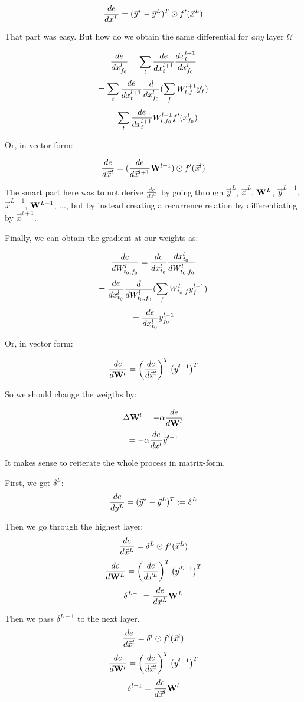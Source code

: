 $$  \frac{ \mathop{de} }{ \mathop{d\vec{x}^L} }  = (\vec{y}^* - \vec{y}^L)^T \odot f'(\vec{x}^L)  $$


That part was easy. But how do we obtain the same differential for \emph{any} layer $l$?

$$  \frac{ \mathop{de} }{ \mathop{dx_{f_0}^l} }  = \sum_t  \frac{ \mathop{de} }{ \mathop{dx_t^{l+1}} }   \frac{ \mathop{dx_t^{l+1}} }{ \mathop{dx_{f_0}^l} }   $$
$$                         = \sum_t  \frac{ \mathop{de} }{ \mathop{dx_t^{l+1}} }   \frac{ \mathop{d} }{ \mathop{dx_{f_0}^l} }  ( \sum_f W_{t,f}^{l+1} y_f^l ) $$
$$                         = \sum_t  \frac{ \mathop{de} }{ \mathop{dx_t^{l+1}} }  W_{t,f_0}^{l+1} f'(x_{f_0}^l)  $$

Or, in vector form: 

$$  \frac{ \mathop{de} }{ \mathop{d\vec{x}^l} }  = (  \frac{ \mathop{de} }{ \mathop{d\vec{x}^{l+1}} }  \mathbf{W}^{l+1} ) \odot f'(\vec{x}^l)  $$

The smart part here was to not derive $  \frac{ \mathop{de} }{ \mathop{d\vec{x}^l} }  $ by going through $\vec{y}^L$, $\vec{x}^L$, $\mathbf{W}^L$, $\vec{y}^{L-1}$, $\vec{x}^{L-1}$, $\mathbf{W}^{L-1}$, ..., but by instead creating a recurrence relation by differentiating by $\vec{x}^{l+1}$.

Finally, we can obtain the gradient at our weights as: 

$$  \frac{ \mathop{de} }{ \mathop{dW_{t_0, f_0}^l} }  =  \frac{ \mathop{de} }{ \mathop{dx_{t_0}^l} }   \frac{ \mathop{dx_{t_0}^l} }{ \mathop{dW_{t_0, f_0}^l} }    $$
$$                              =  \frac{ \mathop{de} }{ \mathop{dx_{t_0}^l} }   \frac{ \mathop{d} }{ \mathop{dW_{t_0, f_0}^l} }  ( \sum_f W_{t_0, f}^l y_f^{l-1} ) $$
$$                              =  \frac{ \mathop{de} }{ \mathop{dx_{t_0}^l} }  y_{f_0}^{l-1} $$

Or, in vector form: 

$$  \frac{ \mathop{de} }{ \mathop{d\mathbf{W}^l} }  = \left(  \frac{ \mathop{de} }{ \mathop{d\vec{x}^l} }  \right)^T  \left( \vec{y}^{l-1} \right)^T $$ 

So we should change the weigths by: 

$$ \Delta \mathbf{W}^l = - \alpha  \frac{ \mathop{de} }{ \mathop{d\mathbf{W}^l} }  $$
$$ = - \alpha  \frac{ \mathop{de} }{ \mathop{d\vec{x}^l} }  \vec{y}^{l-1} $$


It makes sense to reiterate the whole process in matrix-form. 

First, we  get $\delta^L$:
$$  \frac{ \mathop{de} }{ \mathop{d\vec{y}^L} }  = (\vec{y}^* - \vec{y}^L)^T := \delta^L $$ 

Then we go through the highest layer:
$$  \frac{ \mathop{de} }{ \mathop{d\vec{x}^L} }  = \delta^L \odot f'(\vec{x}^L)  $$
$$  \frac{ \mathop{de} }{ \mathop{d\mathbf{W}^L} }  = \left(  \frac{ \mathop{de} }{ \mathop{d\vec{x}^L} }  \right)^T \left( \vec{y}^{L-1} \right)^T $$
$$ \delta^{L-1} =  \frac{ \mathop{de} }{ \mathop{d\vec{x}^L} }  \mathbf{W}^L $$

Then we pass $\delta^{L-1}$ to the next layer. 
$$  \frac{ \mathop{de} }{ \mathop{d\vec{x}^l} }  = \delta^l \odot f'(\vec{x}^l)  $$
$$  \frac{ \mathop{de} }{ \mathop{d\mathbf{W}^l} }  = \left(  \frac{ \mathop{de} }{ \mathop{d\vec{x}^l} }  \right)^T  \left( \vec{y}^{l-1} \right)^T $$
$$ \delta^{l-1} =  \frac{ \mathop{de} }{ \mathop{d\vec{x}^l} }  \mathbf{W}^l $$




